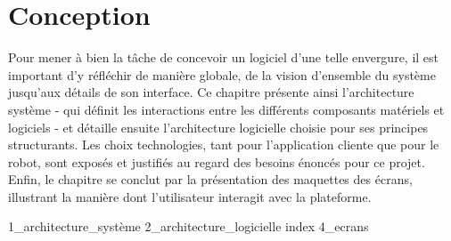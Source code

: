 \section{Conception}

Pour mener à bien la tâche de concevoir un logiciel d'une telle envergure, il est important d'y réfléchir de manière globale, de la vision d'ensemble du système jusqu'aux détails de son interface.
Ce chapitre présente ainsi l'architecture système - qui définit les interactions entre les différents composants matériels et logiciels - et détaille ensuite l'architecture logicielle choisie pour ses principes structurants.
Les choix technologies, tant pour l'application cliente que pour le robot, sont exposés et justifiés au regard des besoins énoncés pour ce projet.
Enfin, le chapitre se conclut par la présentation des maquettes des écrans, illustrant la manière dont l'utilisateur interagit avec la plateforme.

{1_architecture_système}
{2_architecture_logicielle}
{index}
{4_ecrans}